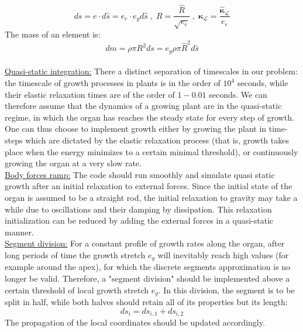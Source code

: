 \documentclass[a4paper, 11pt]{article}
\begin{document}
\begin{equation}
    ds=e\cdot d\hat{s}=e_e\cdot e_gd\hat{s}\;,\;
    R=\frac{\hat{R}}{\sqrt{e_e}}\;,\;
    \boldsymbol{\kappa}_{\mathcal{L}}=\frac{\hat{\boldsymbol{\kappa}}_{\mathcal{L}}}{e_e}
\end{equation}
The mass of an element is:
\begin{equation}
    dm=\rho \pi R^2 ds=e_g\rho\pi\hat{R}^2 d\hat{s}
\end{equation}
\\
\noindent \underline{Quasi-static integration:} There a distinct separation of timescales in our problem: the timescale of growth processes in plants is in the order of $10^4$ seconds, while their elastic relaxation times are of the order of $1-0.01$ seconds. We can therefore assume that the dynamics of a growing plant are in the quasi-static regime, in which the organ has reaches the steady state for every step of growth. One can thus choose to implement growth either by growing the plant in time-steps which are dictated by the elastic relaxation process (that is, growth takes place when the energy minimizes to a certain minimal threshold), or continuously growing the organ at a very slow rate. \\

\noindent \underline{Body forces ramp:} The code should run smoothly and simulate quasi static growth after an initial relaxation to external forces. Since the initial state of the organ is assumed to be a straight rod, the initial relaxation to gravity may take a while due to oscillations and their damping by dissipation. This relaxation initialization can be reduced by adding the external forces in a quasi-static manner.\\

\noindent \underline{Segment division:} For a constant profile of growth rates along the organ, after long periods of time the growth stretch $e_g$ will inevitably reach high values (for example around the apex), for which the discrete segments approximation is no longer be valid. Therefore, a "segment division" should be implemented above a certain threshold of local growth stretch $e_g$. In this division, the segment is to be split in half, while both halves should retain all of its properties but its length:
\begin{equation}
    ds_i=ds_{i,1}+ds_{i,2}
\end{equation}
The propagation of the local coordinates should be updated accordingly.
\\
\end{document}
